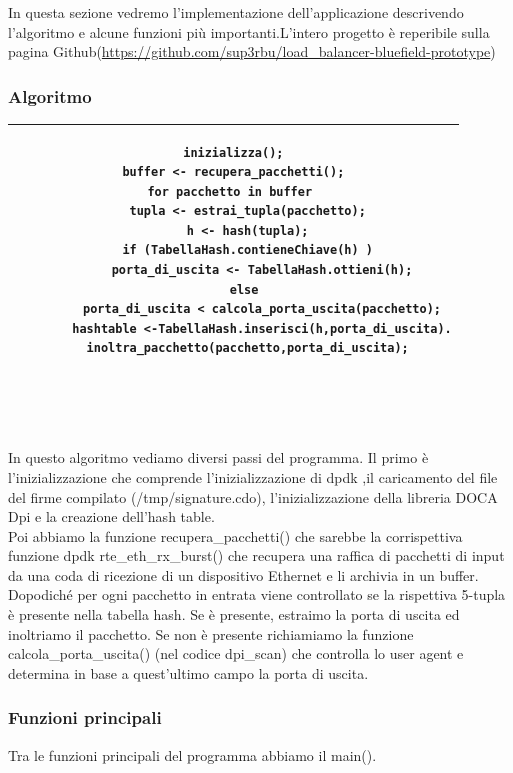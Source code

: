 \documentclass[binding=0.6cm]{sapthesis}
\theoremstyle{definition}
\begin{document}
In questa sezione vedremo l'implementazione dell'applicazione descrivendo l'algoritmo e alcune
funzioni più importanti.L'intero progetto è reperibile sulla pagina 
Github(\url{https://github.com/sup3rbu/load_balancer-bluefield-prototype})
\subsubsection*{Algoritmo}

\begin{tabular}{c}
    \hline
\begin{lstlisting}[basicstyle=\normalsize,  frame=none,firstnumber=0    ]
inizializza();
buffer <- recupera_pacchetti();
for pacchetto in buffer 
    tupla <- estrai_tupla(pacchetto);
    h <- hash(tupla);
    if (TabellaHash.contieneChiave(h) )
        porta_di_uscita <- TabellaHash.ottieni(h);
    else 
        porta_di_uscita < calcola_porta_uscita(pacchetto);
        hashtable <-TabellaHash.inserisci(h,porta_di_uscita).
    inoltra_pacchetto(pacchetto,porta_di_uscita);

\end{lstlisting}\\
\hline
\end{tabular}\\
\\\\
In questo algoritmo vediamo diversi passi del programma.
Il primo è l'inizializzazione che comprende l'inizializzazione di dpdk ,il caricamento del
file del firme compilato (/tmp/signature.cdo), l'inizializzazione della
libreria DOCA Dpi e la creazione dell'hash table.\\
Poi abbiamo la funzione recupera\_pacchetti() che sarebbe la corrispettiva funzione dpdk
rte\_eth\_rx\_burst()  che recupera una raffica di pacchetti di input da una coda di ricezione di
un dispositivo Ethernet e li archivia in un buffer.\\
Dopodiché per ogni pacchetto in entrata viene controllato se la rispettiva 5-tupla è presente nella tabella
hash. Se è presente, estraimo la porta di uscita ed inoltriamo il pacchetto.
Se non è presente richiamiamo la funzione calcola\_porta\_uscita() (nel codice dpi\_scan) che controlla lo user agent e determina
in base a quest'ultimo campo la porta di uscita.



\subsubsection*{Funzioni principali}
Tra le funzioni principali del programma abbiamo il main().
\end{document}
